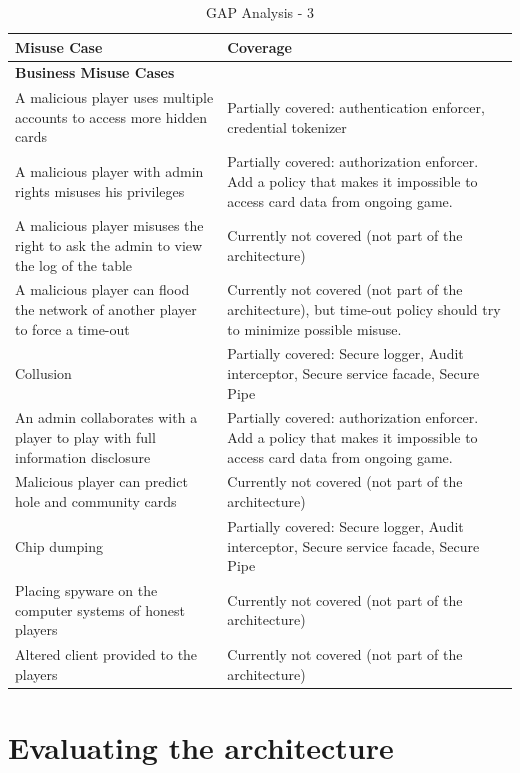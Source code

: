\documentclass[a4paper,11pt]{report}
\begin{document}
\begin{table}[htpb]
\begin{center}
\begin{tabular}{| p{5cm} | p{} |}
\hline
\textbf{Misuse Case} 	& \textbf{Coverage} \\
\hline
\hline
\textbf{Business Misuse Cases} & \\\hline
A malicious player uses multiple accounts to access more hidden cards & Partially covered: authentication enforcer, credential tokenizer \\\hline
A malicious player with admin rights misuses his privileges & Partially covered: authorization enforcer. Add a policy that makes it impossible to access card data from ongoing game. \\\hline
A malicious player misuses the right to ask the admin to view the log of the table & Currently not covered (not part of the architecture) \\\hline
A malicious player can ﬂood the network of another player to force a time-out & Currently not covered (not part of the architecture), but time-out policy should try to minimize possible misuse. \\\hline
Collusion & Partially covered: Secure logger, Audit interceptor, Secure service facade, Secure Pipe \\\hline
An admin collaborates with a player to play with full information disclosure & Partially covered: authorization enforcer. Add a policy that makes it impossible to access card data from ongoing game. \\\hline
Malicious player can predict hole and community cards & Currently not covered (not part of the architecture) \\\hline
Chip dumping & Partially covered: Secure logger, Audit interceptor, Secure service facade, Secure Pipe \\\hline
Placing spyware on the computer systems of honest players & Currently not covered (not part of the architecture) \\\hline
Altered client provided to the players & Currently not covered (not part of the architecture) \\\hline
\end{tabular}
\end{center}
\caption{GAP Analysis - 3}
\label{table:gap3}
\end{table}

\chapter{Evaluating the architecture}
\label{Evaluation}
\end{document}
